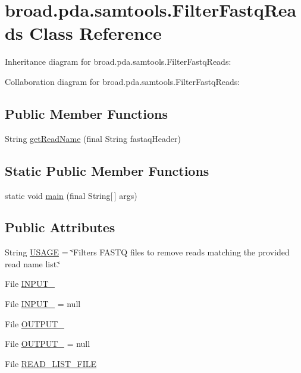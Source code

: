 \hypertarget{classbroad_1_1pda_1_1samtools_1_1_filter_fastq_reads}{\section{broad.\+pda.\+samtools.\+Filter\+Fastq\+Reads Class Reference}
\label{classbroad_1_1pda_1_1samtools_1_1_filter_fastq_reads}
}


Inheritance diagram for broad.\+pda.\+samtools.\+Filter\+Fastq\+Reads\+:


Collaboration diagram for broad.\+pda.\+samtools.\+Filter\+Fastq\+Reads\+:
\subsection*{Public Member Functions}
\begin{DoxyCompactItemize}
\item 
String \hyperlink{classbroad_1_1pda_1_1samtools_1_1_filter_fastq_reads_a796ed4e03547113036c82d2d4525c427}{get\+Read\+Name} (final String fastaq\+Header)
\end{DoxyCompactItemize}
\subsection*{Static Public Member Functions}
\begin{DoxyCompactItemize}
\item 
static void \hyperlink{classbroad_1_1pda_1_1samtools_1_1_filter_fastq_reads_aa564874aaaf58b3008c26590eab3caac}{main} (final String\mbox{[}$\,$\mbox{]} args)
\end{DoxyCompactItemize}
\subsection*{Public Attributes}
\begin{DoxyCompactItemize}
\item 
String \hyperlink{classbroad_1_1pda_1_1samtools_1_1_filter_fastq_reads_adbffc470b8dda8f1db3ff25fca7cebef}{U\+S\+A\+G\+E} = \char`\"{}Filters F\+A\+S\+T\+Q files to remove reads matching the provided read name list.\char`\"{}
\item 
File \hyperlink{classbroad_1_1pda_1_1samtools_1_1_filter_fastq_reads_a90752ab083b3b16496406db95322a5c4}{I\+N\+P\+U\+T\+\_}
\item 
File \hyperlink{classbroad_1_1pda_1_1samtools_1_1_filter_fastq_reads_ac0ab765ce49f2248660d9868c4b96917}{I\+N\+P\+U\+T\+\_} = null
\item 
File \hyperlink{classbroad_1_1pda_1_1samtools_1_1_filter_fastq_reads_ae988fa56a75fac214241d296ab4395dd}{O\+U\+T\+P\+U\+T\+\_}
\item 
File \hyperlink{classbroad_1_1pda_1_1samtools_1_1_filter_fastq_reads_ab519c066d5791016b58d20274f97f50a}{O\+U\+T\+P\+U\+T\+\_} = null
\item 
File \hyperlink{classbroad_1_1pda_1_1samtools_1_1_filter_fastq_reads_a5e87f72abd4a1ce14aec7d9056b837ed}{R\+E\+A\+D\+\_\+\+L\+I\+S\+T\+\_\+\+F\+I\+L\+E}
\end{DoxyCompactItemize}
